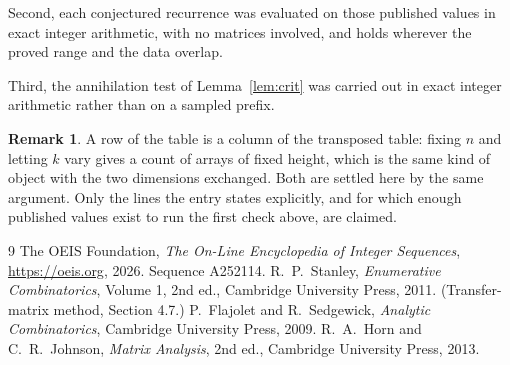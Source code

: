 \documentclass[11pt,a4paper]{article}
\theoremstyle{plain}
\theoremstyle{definition}
\newtheorem{remark}[theorem]{Remark}
\begin{document}
Second, each conjectured recurrence was evaluated on those published values in exact
integer arithmetic, with no matrices involved, and holds wherever the proved range and the
data overlap.

Third, the annihilation test of Lemma~\ref{lem:crit} was carried out in exact integer
arithmetic rather than on a sampled prefix.

\begin{remark}
A row of the table is a column of the transposed table: fixing $n$ and letting $k$ vary gives a
count of arrays of fixed height, which is the same kind of object with the two dimensions
exchanged. Both are settled here by the same argument. Only the lines the entry states
explicitly, and for which enough published values exist to run the first check above, are
claimed.
\end{remark}

\begin{thebibliography}{9}
 The OEIS Foundation, \emph{The On-Line Encyclopedia of Integer
Sequences}, \url{https://oeis.org}, 2026. Sequence A252114.
 R.~P.~Stanley, \emph{Enumerative Combinatorics}, Volume 1, 2nd ed.,
Cambridge University Press, 2011. (Transfer-matrix method, Section 4.7.)
 P.~Flajolet and R.~Sedgewick, \emph{Analytic Combinatorics}, Cambridge
University Press, 2009.
 R.~A.~Horn and C.~R.~Johnson, \emph{Matrix Analysis}, 2nd ed., Cambridge
University Press, 2013.
\end{thebibliography}
\end{document}
